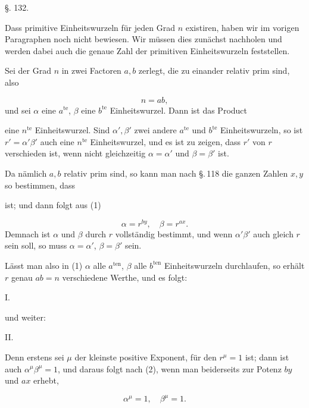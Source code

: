 \begin{center}
§. 132.

\end{center}

Dass primitive Einheitswurzeln für jeden Grad $n$ existiren, haben wir im vorigen
Paragraphen noch nicht bewiesen. Wir müssen dies zunächst nachholen und werden dabei
auch die genaue Zahl der primitiven Einheitswurzeln feststellen.

Sei der Grad $n$ in zwei Factoren $a, b$ zerlegt, die zu einander relativ prim sind, also

\[
n = ab,
\]
und sei $\alpha$ eine $a^{\mathrm{te}}$, $\beta$ eine $b^{\mathrm{te}}$ Einheitswurzel. Dann
ist das Product

eine $n^{\mathrm{te}}$ Einheitswurzel. Sind $\alpha', \beta'$ zwei andere $a^{\mathrm{te}}$
und $b^{\mathrm{te}}$ Einheitswurzeln, so ist $r' = \alpha'\beta'$ auch eine
$n^{\mathrm{te}}$ Einheitswurzel, und es ist zu zeigen, dass $r'$ von $r$ verschieden ist,
wenn nicht gleichzeitig $\alpha = \alpha'$ und $\beta = \beta'$ ist.

Da nämlich $a, b$ relativ prim sind, so kann man nach \S.\,118 die ganzen Zahlen $x, y$ so
bestimmen, dass

ist; und dann folgt aus (1)

\[
\alpha = r^{by}, \quad \beta = r^{ax}.
\]
Demnach ist $\alpha$ und $\beta$ durch $r$ vollständig bestimmt, und wenn $\alpha'\beta'$
auch gleich $r$ sein soll, so muss $\alpha = \alpha'$, $\beta = \beta'$ sein.

Lässt man also in (1) $\alpha$ alle $a^{\mathrm{ten}}$, $\beta$ alle $b^{\mathrm{ten}}$
Einheitswurzeln durchlaufen, so erhält $r$ genau $ab = n$ verschiedene Werthe, und es
folgt:

I.~

und weiter:

II.~

Denn erstens sei $\mu$ der kleinste positive Exponent, für den $r^\mu = 1$ ist; dann ist
auch $\alpha^\mu \beta^\mu = 1$, und daraus folgt nach (2), wenn man beiderseits zur
Potenz $by$ und $ax$ erhebt,

\[
\alpha^\mu = 1, \quad \beta^\mu = 1.
\]
